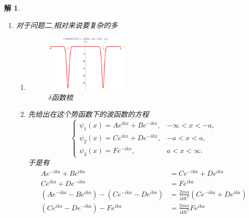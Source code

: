 \documentclass{article}
\newtheorem{solution}{解}
\begin{document}
\begin{solution}
\begin{enumerate}
                于是可以求得，反射率和透射率为
                \begin{align*}
                    &R=\left|\frac{m\alpha/\hbar^{2}}{ik-m\alpha/\hbar^{2}}\right|^{2}=\frac{(m\alpha/\hbar^{2})^{2}}{k^{2}+(m\alpha/\hbar^{2})^{2}} \\
                &T=\left|\frac{ik}{ik-m\alpha/\hbar^{2}}\right|^{2}=\frac{k^{2}}{k^{2}+(m\alpha/\hbar^{2})^{2}} 
                \end{align*}
                
                很显然，有关系
                \[R+T=1\]
        \item 对于问题二,相对来说要复杂的多
        \begin{enumerate}
            \item[(a)]
            \begin{figure}[hbtp]
                \centering
                \includegraphics[width=0.4\textwidth]{figure/双delta函数势.png}
                \caption{$\delta$函数梳}
                \label{fig:delta函数梳}
            \end{figure}
            \item[(b)] 先给出在这个势函数下的波函数的方程
            \[
                \begin{cases}
                \psi_1\left(x\right)=Ae^{ikx}+Be^{-ikx},&-\infty<x<-a,\\
                \psi_2\left(x\right)=Ce^{ikx}+De^{-ikx},&-a<x<a,\\
                \psi_3\left(x\right)=Fe^{-ikx},&a<x<\infty.
                \end{cases}
            \]
            于是有
            \begin{align*}
                Ae^{-ika}+Be^{ika}&=Ce^{-ika}+De^{ika}\\
                Ce^{ika}+De^{-ika}&=Fe^{ika}\\
                (Ae^{-ika}-Be^{ika})-(Ce^{-ika}-De^{ika})&=\frac{2m\alpha}{ik\hbar^2}\left(Ce^{-ika}+De^{ika}\right)\\
                (Ce^{ika}-De^{-ika})-Fe^{ika}&=\frac{2m\alpha}{ik\hbar^2}Fe^{ika}
            \end{align*}


\end{enumerate}
\end{enumerate}
\end{solution}
\end{document}
